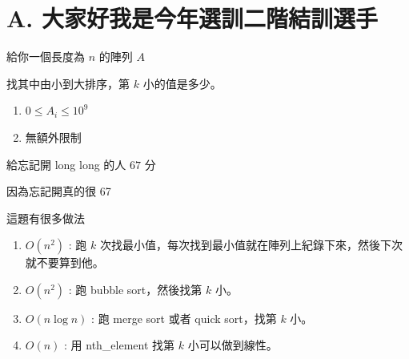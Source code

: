 \section{A. 大家好我是今年選訓二階結訓選手}

\begin{frame}{}
    給你一個長度為 $n$ 的陣列 $A$

    找其中由小到大排序，第 $k$ 小的值是多少。
\end{frame}

\begin{frame}{}
    \begin{enumerate}
        \item{$0 \le A_i \le 10^9$}
        \item{無額外限制}
    \end{enumerate}
\end{frame}

\begin{frame}{}
    給忘記開 long long 的人 $67$ 分

    因為忘記開真的很 67
\end{frame}

\begin{frame}{}
    這題有很多做法

    \begin{enumerate}
        \item{$O(n^2)$ : 跑 $k$ 次找最小值，每次找到最小值就在陣列上紀錄下來，然後下次就不要算到他。}
        \item{$O(n^2)$ : 跑 bubble sort，然後找第 $k$ 小。}
        \item{$O(n \log{n})$ : 跑 merge sort 或者 quick sort，找第 $k$ 小。}
        \item{$O(n)$ : 用 nth\_element 找第 $k$ 小可以做到線性。}
    \end{enumerate}
\end{frame}


